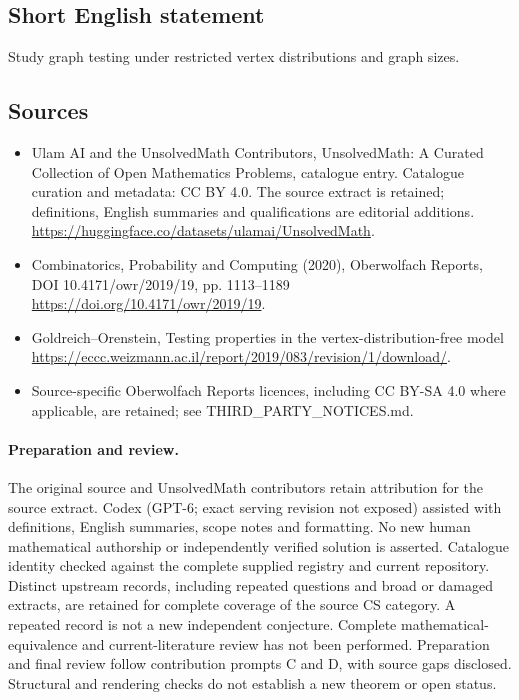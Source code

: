 \documentclass[11pt]{article}
\begin{document}
\subsection{Short English statement}
Study graph testing under restricted vertex distributions and graph sizes.
\subsection{Sources}
\begin{itemize}
\item[\hypertarget{source:statement:1}{S1}] Ulam AI and the UnsolvedMath Contributors, UnsolvedMath: A Curated Collection of Open Mathematics Problems, catalogue entry. Catalogue curation and metadata: CC BY 4.0. The source extract is retained; definitions, English summaries and qualifications are editorial additions.
\url{https://huggingface.co/datasets/ulamai/UnsolvedMath}.
\item[\hypertarget{source:statement:2}{S2}] Combinatorics, Probability and Computing (2020), Oberwolfach Reports, DOI 10.4171/owr/2019/19, pp. 1113--1189
\url{https://doi.org/10.4171/owr/2019/19}.
\item[\hypertarget{source:statement:3}{S3}] Goldreich--Orenstein, Testing properties in the vertex-distribution-free model
\url{https://eccc.weizmann.ac.il/report/2019/083/revision/1/download/}.
\item Source-specific Oberwolfach Reports licences, including CC BY-SA 4.0 where applicable, are retained; see THIRD\_PARTY\_NOTICES.md.
\end{itemize}
\paragraph{Preparation and review.}
The original source and UnsolvedMath contributors retain attribution for the source extract. Codex (GPT-6; exact serving revision not exposed) assisted with definitions, English summaries, scope notes and formatting. No new human mathematical authorship or independently verified solution is asserted. Catalogue identity checked against the complete supplied registry and current repository. Distinct upstream records, including repeated questions and broad or damaged extracts, are retained for complete coverage of the source CS category. A repeated record is not a new independent conjecture. Complete mathematical-equivalence and current-literature review has not been performed. Preparation and final review follow contribution prompts C and D, with source gaps disclosed. Structural and rendering checks do not establish a new theorem or open status.
\label{end:statement}
\end{document}
